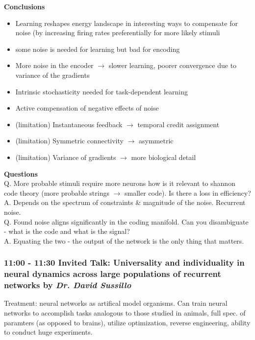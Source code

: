 \documentclass[12pt]{article}
\begin{document}
\textbf{Conclusions}
\begin{itemize}
    \item Learning reshapes energy landscape in interesting ways to compensate for noise (by increasing firing rates preferentially for more likely stimuli
    \item some noise is needed for learning but bad for encoding
    \item More noise in the encoder $\rightarrow$ slower learning, poorer convergence due to variance of the gradients 
    \item Intrinsic stochasticity needed for task-dependent learning
    \item Active compensation of negative effects of noise
    \item (limitation) Instantaneous feedback $\rightarrow$ temporal credit assignment
    \item (limitation) Symmetric connectivity $\rightarrow$ asymmetric
    \item (limitation) Variance of gradients $\rightarrow$ more biological detail
\end{itemize}

\textbf{Questions} \\

Q. More probable stimuli require more neurons how is it relevant to shannon code theory (more probable strings $\rightarrow$ smaller code). Is there a loss in efficiency? \\ 

A. Depends on the spectrum of constraints \& magnitude of the noise. Recurrent noise. \\

Q. Found noise aligns significantly in the coding manifold. Can you disambiguate - what is the code and what is the signal? \\

A. Equating the two - the output of the network is the only thing that matters.


\subsubsection{11:00 - 11:30 Invited Talk: Universality and individuality in neural dynamics across large populations of recurrent networks by \textit{Dr. David Sussillo}}

Treatment: neural networks as artifical model organisms. Can train neural networks to accomplish tasks analogous to those studied in animals, full spec. of paramters (as opposed to brains), utilize optimization, reverse engineering, ability to conduct huge experiments. \\
\end{document}

